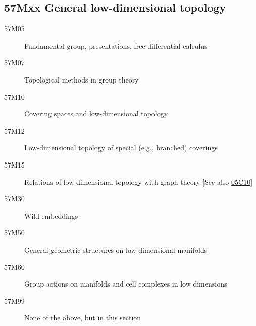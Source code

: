 \documentclass[letterpaper]{article}
\begin{document}
\subsection*{57Mxx  General low-dimensional topology }\label{57Mxx}
\begin{description}  
\item [57M05]\label{57M05} Fundamental group, presentations, free differential calculus
\item [57M07]\label{57M07} Topological methods in group theory
\item [57M10]\label{57M10} Covering spaces and low-dimensional topology
\item [57M12]\label{57M12} Low-dimensional topology of special (e.g., branched) coverings
\item [57M15]\label{57M15} Relations of low-dimensional topology with graph theory [See also \hyperref[05C10]{05C10}]
\item [57M30]\label{57M30} Wild embeddings
\item [57M50]\label{57M50} General geometric structures on low-dimensional manifolds
\item [57M60]\label{57M60} Group actions on manifolds and cell complexes in low dimensions
\item [57M99]\label{57M99} None of the above, but in this section
\end{description}
\end{document}

